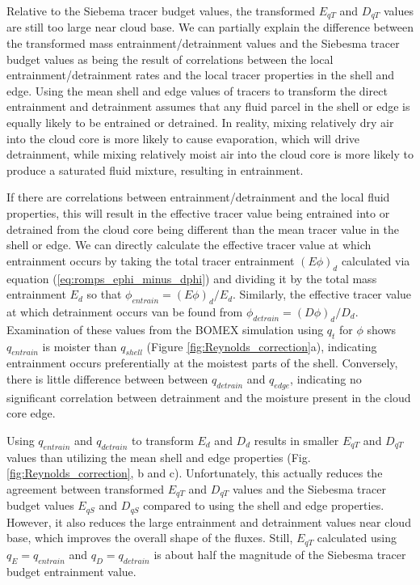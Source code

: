\documentclass[12pt]{article}
\begin{document}
Relative to the Siebema tracer budget
values, the transformed $E_{q T}$ and $D_{q T}$ values are still too large 
near cloud base. 
We can partially explain the difference between the transformed mass 
entrainment/detrainment values and the Siebesma tracer budget values as 
being the result of correlations between the local entrainment/detrainment 
rates and the local tracer properties in the shell and edge.  Using the 
mean shell and edge values of tracers to transform the direct entrainment 
and detrainment assumes that any fluid parcel in the shell or edge is 
equally likely to be entrained or detrained.  In reality, mixing relatively 
dry air into the cloud core is more likely to cause evaporation, which will 
drive detrainment, while mixing relatively moist air into the cloud core is 
more likely to produce a saturated fluid mixture, resulting in entrainment.

If there are correlations between entrainment/detrainment and the local 
fluid properties, this will result in the effective tracer value being 
entrained into or detrained from the cloud core being different than the 
mean tracer value in the shell or edge.  We can directly calculate the 
effective tracer value at which entrainment occurs by taking the total 
tracer entrainment $(E\phi)_d$ calculated via equation 
(\ref{eq:romps_ephi_minus_dphi}) and dividing it by the total mass
entrainment $E_d$ so that $\phi_{entrain} = (E\phi)_d / E_d$.  Similarly, 
the effective tracer value at which detrainment occurs van be found from  
$\phi_{detrain} = (D\phi)_d / D_d$.  Examination of these values from the 
BOMEX simulation using $q_t$ for $\phi$ shows $q_{entrain}$ is moister than 
$q_{shell}$ (Figure \ref{fig:Reynolds_correction}a), indicating entrainment
occurs preferentially at the moistest parts of the shell.  Conversely, 
there is little difference between between $q_{detrain}$ and $q_{edge}$,
indicating no significant correlation between detrainment and the moisture
present in the cloud core edge.

Using $q_{entrain}$ and $q_{detrain}$ to transform $E_d$ and $D_d$ results 
in smaller $E_{q T}$ and $D_{q T}$ values than utilizing the mean shell and 
edge properties (Fig. \ref{fig:Reynolds_correction}, b and c).  
Unfortunately, this actually reduces the agreement between transformed 
$E_{q T}$ and $D_{q T}$ values and the Siebesma tracer budget values 
$E_{q S}$ and $D_{q S}$ compared to using the shell and edge properties.
 However, it also reduces the large entrainment and detrainment values near 
cloud base, which improves the overall shape of the fluxes.  Still, 
$E_{q T}$ calculated using $q_E = q_{entrain}$ and $q_D = q_{detrain}$ is 
about half the magnitude of the Siebesma tracer budget entrainment value.
\end{document}
